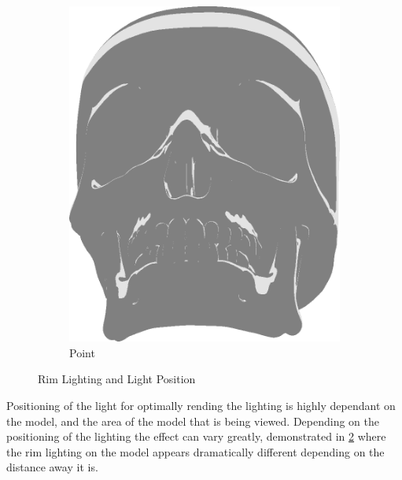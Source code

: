 \begin{figure}[h]
\begin{subfigure}[b]{0.15\textwidth}
        \includegraphics[width=\textwidth]{img/Lighting/Point.png}
        \caption{Point}
        \label{fig:LightingPosPos}
    \end{subfigure}
\caption{Rim Lighting and Light Position}
 \label{fig:LightingPosRim}
 \end{figure}

Positioning of the light for optimally rending the lighting is highly dependant on the model, and the area of the model that is being viewed. Depending on the positioning of the lighting the effect can vary greatly, demonstrated in \ref{fig:LightingPosRim} where the rim lighting on the model appears dramatically different depending on the distance away it is.


